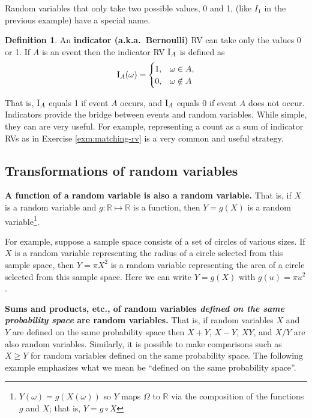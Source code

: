 \documentclass[
]{book}
\theoremstyle{definition}
\newtheorem{definition}{Definition}[chapter]
\theoremstyle{definition}
\theoremstyle{definition}
\theoremstyle{remark}
\begin{document}
Random variables that only take two possible values, 0 and 1, (like \(I_1\) in the previous example) have a special name.

\begin{definition}
\protect\hypertarget{def:indicator}{}{\label{def:indicator} }An \textbf{indicator (a.k.a.~Bernoulli)} RV can take only the values 0 or 1. If \(A\) is an event then the indicator RV \(\textrm{I}_A\) is defined as
\[
\textrm{I}_A(\omega) =
\begin{cases}
1, & \omega \in A,\\
0, & \omega \notin A
\end{cases}
\]
\end{definition}

That is, \(\textrm{I}_A\) equals 1 if event \(A\) occurs, and \(\textrm{I}_A\) equals 0 if event \(A\) does not occur. Indicators provide the bridge between events and random variables. While simple, they can are very useful.
For example, representing a count as a sum of indicator RVs as in Exercise \ref{exm:matching-rv} is a very common and useful strategy.

\hypertarget{transform}{%
\subsection{Transformations of random variables}\label{transform}}

\textbf{A function of a random variable is also a random variable.} That is, if \(X\) is a random variable and \(g:\mathbb{R}\mapsto\mathbb{R}\) is a function, then \(Y=g(X)\) is a random variable\footnote{\(Y(\omega) = g(X(\omega))\) so \(Y\) maps \(\Omega\) to \(\mathbb{R}\) via the composition of the functions \(g\) and \(X\); that is, \(Y=g\circ X\)}.

For example, suppose a sample space consists of a set of circles of various sizes. If \(X\) is a random variable representing the radius of a circle selected from this sample space, then \(Y = \pi X^2\) is a random variable representing the area of a circle selected from this sample space. Here we can write \(Y=g(X)\) with \(g(u) = \pi u^2\).

\textbf{Sums and products, etc., of random variables \emph{defined on the same probability space} are random variables.} That is, if random variables \(X\) and \(Y\) are defined on the same probability space then \(X+Y\), \(X-Y\), \(XY\), and \(X/Y\) are also random variables. Similarly, it is possible to make comparisons such as \(X\ge Y\) for random variables defined on the same probability space. The following example emphasizes what we mean be ``defined on the same probability space''.
\end{document}

